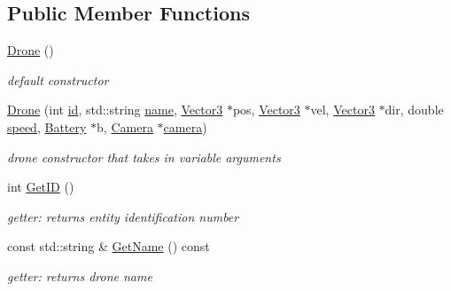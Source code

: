 \subsection*{Public Member Functions}
\begin{DoxyCompactItemize}
\item 
\mbox{\label{classDrone_ab692baa4be5c43b72990ce1b01bdc805}} 
\hyperlink{classDrone_ab692baa4be5c43b72990ce1b01bdc805}{Drone} ()
\begin{DoxyCompactList}\small\item\em default constructor \end{DoxyCompactList}\item 
\mbox{\label{classDrone_a8847d17aacd1efc2b64827de2b58c4c7}} 
\hyperlink{classDrone_a8847d17aacd1efc2b64827de2b58c4c7}{Drone} (int \hyperlink{classDrone_a5aa543be4e70c00b14a38fef06bf6166}{id}, std\+::string \hyperlink{classDrone_ac5f6c269378659247acd057142542013}{name}, \hyperlink{classVector3}{Vector3} $\ast$pos, \hyperlink{classVector3}{Vector3} $\ast$vel, \hyperlink{classVector3}{Vector3} $\ast$dir, double \hyperlink{classDrone_a4cbe7d72da36c27cb58fa797240c9698}{speed}, \hyperlink{classBattery}{Battery} $\ast$b, \hyperlink{classCamera}{Camera} $\ast$\hyperlink{classDrone_aab172d13642014c08807fc71d04600d3}{camera})
\begin{DoxyCompactList}\small\item\em drone constructor that takes in variable arguments \end{DoxyCompactList}\item 
\mbox{\label{classDrone_a5e69f5ebe80ece53ccb2238a2b598d97}} 
int \hyperlink{classDrone_a5e69f5ebe80ece53ccb2238a2b598d97}{Get\+ID} ()
\begin{DoxyCompactList}\small\item\em getter\+: returns entity identification number \end{DoxyCompactList}\item 
\mbox{\label{classDrone_a8a80f440dcffdf3f2fe1766ef052ec52}} 
const std\+::string \& \hyperlink{classDrone_a8a80f440dcffdf3f2fe1766ef052ec52}{Get\+Name} () const
\begin{DoxyCompactList}\small\item\em getter\+: returns drone name \end{DoxyCompactList}\item 

\end{DoxyCompactItemize}
